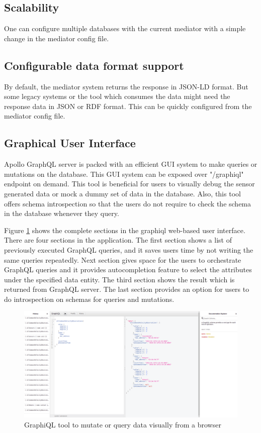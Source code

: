 \subsection{Scalability}
One can configure multiple databases with the current mediator with a simple change in the mediator config file.

\subsection{Configurable data format support}
By default, the mediator system returns the response in JSON-LD format. But some legacy systems or the tool which consumes the data might need the response data in JSON or RDF format. This can be quickly configured from the mediator config file.

\subsection{Graphical User Interface}
Apollo GraphQL server is packed with an efficient GUI system to make queries or mutations on the database. This GUI system can be exposed over "/graphiql" endpoint on demand. This tool is beneficial for users to visually debug the sensor generated data or mock a dummy set of data in the database. Also, this tool offers schema introspection so that the users do not require to check the schema in the database whenever they query. 

Figure \ref{fig:graphiql_gui} shows the complete sections in the graphiql web-based user interface. There are four sections in the application. The first section shows a list of previously executed GraphQL queries, and it saves users time by not writing the same queries repeatedly. Next section gives space for the users to orchestrate GraphQL queries and it provides autocompletion feature to select the attributes under the specified data entity. The third section shows the result which is returned from GraphQL server. The last section provides an option for users to do introspection on schemas for queries and mutations.

	\begin{figure}[!htbp] 
		\begin{center}
			\includegraphics[scale=0.23]{./images/png/graphiql_gui}	
			\caption{GraphiQL tool to mutate or query data visually from a browser}	
			\label{fig:graphiql_gui}	
		\end{center}
	\end{figure}

